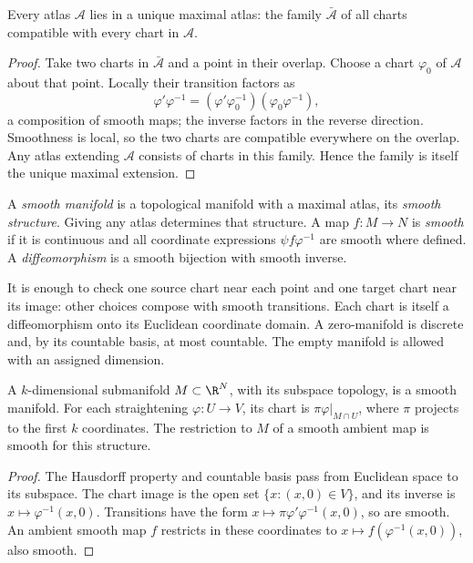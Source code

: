 \begin{proposition}\label{prop:maxatlas}
Every atlas $\mathcal A$ lies in a unique maximal atlas: the family $\bar{\mathcal A}$ of all charts compatible with every chart in $\mathcal A$.
\end{proposition}
\begin{proof}
Take two charts in $\bar{\mathcal A}$ and a point in their overlap. Choose a chart $\varphi_0$ of $\mathcal A$ about that point. Locally their transition factors as
\[
\varphi'\varphi^{-1}=(\varphi'\varphi_0^{-1})(\varphi_0\varphi^{-1}),
\]
a composition of smooth maps; the inverse factors in the reverse direction. Smoothness is local, so the two charts are compatible everywhere on the overlap. Any atlas extending $\mathcal A$ consists of charts in this family. Hence the family is itself the unique maximal extension.
\end{proof}

\begin{definition}
A \emph{smooth manifold} is a topological manifold with a maximal atlas, its \emph{smooth structure}. Giving any atlas determines that structure. A map $f:M\to N$ is \emph{smooth} if it is continuous and all coordinate expressions $\psi f\varphi^{-1}$ are smooth where defined. A \emph{diffeomorphism} is a smooth bijection with smooth inverse.
\end{definition}

It is enough to check one source chart near each point and one target chart near its image: other choices compose with smooth transitions. Each chart is itself a diffeomorphism onto its Euclidean coordinate domain. A zero-manifold is discrete and, by its countable basis, at most countable. The empty manifold is allowed with an assigned dimension.

\begin{proposition}\label{prop:subisman}
A $k$-dimensional submanifold $M\subset\R^N$, with its subspace topology, is a smooth manifold. For each straightening $\varphi:U\to V$, its chart is $\pi\varphi|_{M\cap U}$, where $\pi$ projects to the first $k$ coordinates. The restriction to $M$ of a smooth ambient map is smooth for this structure.
\end{proposition}
\begin{proof}
The Hausdorff property and countable basis pass from Euclidean space to its subspace. The chart image is the open set $\{x:(x,0)\in V\}$, and its inverse is $x\mapsto\varphi^{-1}(x,0)$. Transitions have the form $x\mapsto\pi\varphi'\varphi^{-1}(x,0)$, so are smooth. An ambient smooth map $f$ restricts in these coordinates to $x\mapsto f(\varphi^{-1}(x,0))$, also smooth.
\end{proof}

